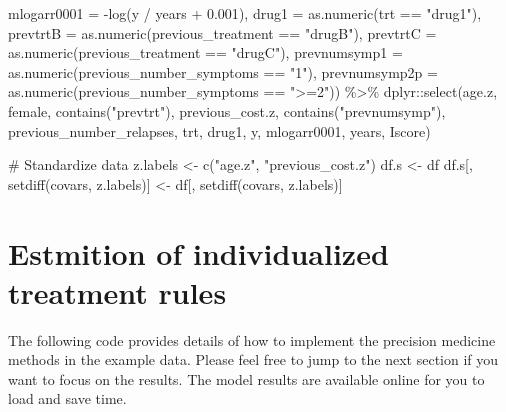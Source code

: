 \documentclass[
  letterpaper,
  DIV=11,
  numbers=noendperiod]{scrreprt}
\newenvironment{Shaded}{\begin{snugshade}}{\end{snugshade}}
\newcommand{\AttributeTok}[1]{\textcolor[rgb]{0.40,0.45,0.13}{#1}}
\newcommand{\CommentTok}[1]{\textcolor[rgb]{0.37,0.37,0.37}{#1}}
\newcommand{\FloatTok}[1]{\textcolor[rgb]{0.68,0.00,0.00}{#1}}
\newcommand{\FunctionTok}[1]{\textcolor[rgb]{0.28,0.35,0.67}{#1}}
\newcommand{\NormalTok}[1]{\textcolor[rgb]{0.00,0.23,0.31}{#1}}
\newcommand{\OtherTok}[1]{\textcolor[rgb]{0.00,0.23,0.31}{#1}}
\newcommand{\SpecialCharTok}[1]{\textcolor[rgb]{0.37,0.37,0.37}{#1}}
\newcommand{\StringTok}[1]{\textcolor[rgb]{0.13,0.47,0.30}{#1}}
\begin{document}
\begin{Shaded}
\begin{Highlighting}[]
         \AttributeTok{mlogarr0001 =} \SpecialCharTok{{-}}\FunctionTok{log}\NormalTok{(y }\SpecialCharTok{/}\NormalTok{ years }\SpecialCharTok{+} \FloatTok{0.001}\NormalTok{),}
         \AttributeTok{drug1 =} \FunctionTok{as.numeric}\NormalTok{(trt }\SpecialCharTok{==} \StringTok{"drug1"}\NormalTok{),}
         \AttributeTok{prevtrtB =} \FunctionTok{as.numeric}\NormalTok{(previous\_treatment }\SpecialCharTok{==} \StringTok{"drugB"}\NormalTok{),}
         \AttributeTok{prevtrtC =} \FunctionTok{as.numeric}\NormalTok{(previous\_treatment }\SpecialCharTok{==} \StringTok{"drugC"}\NormalTok{),}
         \AttributeTok{prevnumsymp1 =} \FunctionTok{as.numeric}\NormalTok{(previous\_number\_symptoms }\SpecialCharTok{==} \StringTok{"1"}\NormalTok{),}
         \AttributeTok{prevnumsymp2p =} \FunctionTok{as.numeric}\NormalTok{(previous\_number\_symptoms }\SpecialCharTok{==} \StringTok{"\textgreater{}=2"}\NormalTok{)) }\SpecialCharTok{\%\textgreater{}\%}
\NormalTok{  dplyr}\SpecialCharTok{::}\FunctionTok{select}\NormalTok{(age.z, female, }\FunctionTok{contains}\NormalTok{(}\StringTok{"prevtrt"}\NormalTok{), previous\_cost.z, }
                \FunctionTok{contains}\NormalTok{(}\StringTok{"prevnumsymp"}\NormalTok{), }
\NormalTok{                previous\_number\_relapses, trt, drug1, y, }
\NormalTok{                mlogarr0001, years, Iscore)}

\CommentTok{\# Standardize data}
\NormalTok{z.labels }\OtherTok{\textless{}{-}} \FunctionTok{c}\NormalTok{(}\StringTok{"age.z"}\NormalTok{, }\StringTok{"previous\_cost.z"}\NormalTok{)}
\NormalTok{df.s }\OtherTok{\textless{}{-}}\NormalTok{ df}
\NormalTok{df.s[, }\FunctionTok{setdiff}\NormalTok{(covars, z.labels)] }\OtherTok{\textless{}{-}}\NormalTok{ df[, }\FunctionTok{setdiff}\NormalTok{(covars, z.labels)]}
\end{Highlighting}
\end{Shaded}

\hypertarget{estmition-of-individualized-treatment-rules}{%
\section{Estmition of individualized treatment
rules}\label{estmition-of-individualized-treatment-rules}}

The following code provides details of how to implement the precision
medicine methods in the example data. Please feel free to jump to the
next section if you want to focus on the results. The model results are
available online for you to load and save time.
\end{document}
